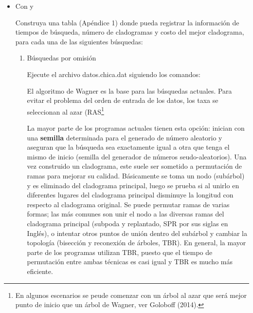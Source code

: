 \begin{itemize}
  \item Con  y 

Construya una tabla (Ap\'endice 1) 
donde pueda registrar la informaci\'on de tiempos de b\'usqueda,   n\'umero de cladogramas y costo del mejor cladograma,  para cada una de las siguientes b\'usquedas:
 

\begin{enumerate}
\item  {B\'usquedas por omisi\'on}

  Ejecute el archivo datos.chica.dat siguiendo los comandos:

  \begin{itemize}
  \item  {}


  \item  {}

  \item  {}
  \Cmd{build()
  \Cmd{swap()}


  \item  \Pname{ PAUP*}
  \Cmd{set criterion=parsimony}
  \Cmd{exec nombre\_archivo}
  \Cmd{hsearch}

  \end{itemize}

  El algoritmo de Wagner es la base para las b\'usquedas actuales. Para evitar el problema del orden de entrada de los datos,   los taxa se  seleccionan al azar (RAS\footnote{En algunos escenarios se peude comenzar con un \'arbol al azar que ser\'a mejor punto de inicio que un \'arbol de Wagner, ver Goloboff (2014).}
%
 
  La mayor parte de los programas actuales tienen esta opci\'on: inician con una \textbf{semilla} determinada para el generado de n\'umero aleatorio y aseguran que la b\'usqueda sea exactamente igual a otra que tenga el mismo de inicio (semilla del generador de n\'umeros seudo-aleatorios). Una vez construido un cladograma,  este suele ser sometido a permutaci\'on de ramas para mejorar su calidad. B\'asicamente se toma un nodo (sub\'arbol) y es eliminado del cladograma principal,   luego se prueba si al unirlo en diferentes lugares del cladograma principal disminuye la longitud con respecto al cladograma original. Se puede permutar ramas de varias formas;  las m\'as comunes son unir el nodo a las diversas ramas del cladograma principal (subpoda y replantado,  SPR por sus siglas en Ingl\'es),  o intentar otros puntos de uni\'on dentro del sub\'arbol y cambiar la topolog\'ia (bisecci\'on y reconexi\'on de \'arboles,  TBR). En general,   la mayor parte de los programas utilizan TBR,  puesto que el tiempo de permutaci\'on entre ambas t\'ecnicas es casi igual y TBR es mucho m\'as eficiente.


\end{enumerate}
\end{itemize}
